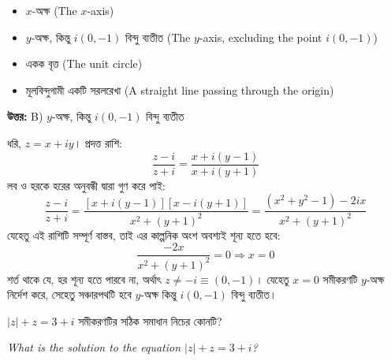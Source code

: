\documentclass[12pt, a4paper]{article}
\begin{document}
\begin{itemize}[label={}, leftmargin=1cm, itemsep=0.5em]
    \item[\textbf{A)}] $x$-অক্ষ (The $x$-axis)
    \item[\textbf{B)}] $y$-অক্ষ, কিন্তু $i(0, -1)$ বিন্দু ব্যতীত (The $y$-axis, excluding the point $i(0, -1)$)
    \item[\textbf{C)}] একক বৃত্ত (The unit circle)
    \item[\textbf{D)}] মূলবিন্দুগামী একটি সরলরেখা (A straight line passing through the origin)
\end{itemize}

\vspace{0.5em}
\begin{tcolorbox}[answerbox]
    \textbf{\color{success} উত্তর:} B) $y$-অক্ষ, কিন্তু $i(0, -1)$ বিন্দু ব্যতীত
\end{tcolorbox}
\vspace{1em}

\begin{tcolorbox}[solutionbox={সমাধান (Solution)}]
    \noindent
    ধরি, $z = x + iy$। প্রদত্ত রাশি:
    \[ \frac{z - i}{z + i} = \frac{x + i(y-1)}{x + i(y+1)} \]
    লব ও হরকে হরের অনুবন্ধী দ্বারা গুণ করে পাই:
    \[ \frac{z - i}{z + i} = \frac{[x + i(y-1)][x - i(y+1)]}{x^2 + (y+1)^2} = \frac{(x^2 + y^2 - 1) - 2ix}{x^2 + (y+1)^2} \]
    যেহেতু এই রাশিটি সম্পূর্ণ বাস্তব, তাই এর কাল্পনিক অংশ অবশ্যই শূন্য হতে হবে:
    \[ \frac{-2x}{x^2 + (y+1)^2} = 0 \Rightarrow x = 0 \]
    শর্ত থাকে যে, হর শূন্য হতে পারবে না, অর্থাৎ $z \neq -i \equiv (0, -1)$। 
    যেহেতু $x=0$ সমীকরণটি $y$-অক্ষ নির্দেশ করে, সেহেতু সঞ্চারপথটি হবে $y$-অক্ষ কিন্তু $i(0, -1)$ বিন্দু ব্যতীত।
\end{tcolorbox}

\vspace{1.5em}

\begin{tcolorbox}[questionbox={প্রশ্ন (Question) 20}]
    \noindent
    $|z| + z = 3 + i$ সমীকরণটির সঠিক সমাধান নিচের কোনটি?
    
    \vspace{0.8em}
    \begin{english}
    \noindent\textit{\color{darkgray}
    What is the solution to the equation $|z| + z = 3 + i$?
    }
    \end{english}
\end{tcolorbox}
\end{document}
